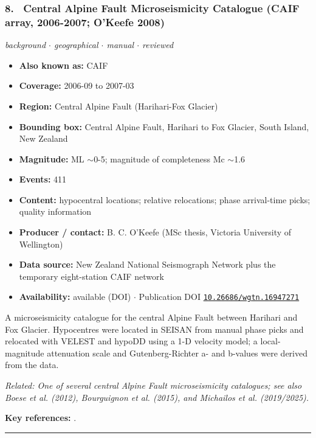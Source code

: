 \documentclass[10pt,a4paper]{article}
\newcommand{\catentryrule}{\par\vspace{3pt}\noindent\textcolor{rulegrey}{\rule{\linewidth}{0.3pt}}\par\vspace{5pt}}
\newcommand{\kv}[2]{\item \textbf{#1:} #2}
\begin{document}
\subsubsection*{\hypertarget{c:8}{8.}~ Central Alpine Fault Microseismicity Catalogue (CAIF array, 2006-2007; O'Keefe 2008)}
{\small\itshape background $\cdot$ geographical $\cdot$ manual $\cdot$ reviewed}\par\vspace{2pt}
\begin{itemize}[leftmargin=1.3em,itemsep=0.6pt,topsep=1pt,parsep=0pt]
\kv{Also known as}{CAIF}
\kv{Coverage}{2006-09 to 2007-03}
\kv{Region}{Central Alpine Fault (Harihari-Fox Glacier)}
\kv{Bounding box}{Central Alpine Fault, Harihari to Fox Glacier, South Island, New Zealand}
\kv{Magnitude}{ML $\sim$0-5; magnitude of completeness Mc $\sim$1.6}
\kv{Events}{411}
\kv{Content}{hypocentral locations; relative relocations; phase arrival-time picks; quality information}
\kv{Producer / contact}{B. C. O'Keefe (MSc thesis, Victoria University of Wellington)}
\kv{Data source}{New Zealand National Seismograph Network plus the temporary eight-station CAIF network}
\kv{Availability}{available (DOI) $\cdot$ Publication DOI \href{https://doi.org/10.26686/wgtn.16947271}{\nolinkurl{10.26686/wgtn.16947271}}}
\end{itemize}
\par\vspace{2pt}A microseismicity catalogue for the central Alpine Fault between Harihari and Fox Glacier. Hypocentres were located in SEISAN from manual phase picks and relocated with VELEST and hypoDD using a 1-D velocity model; a local-magnitude attenuation scale and Gutenberg-Richter a- and b-values were derived from the data.
\par{\small\itshape Related: One of several central Alpine Fault microseismicity catalogues; see also Boese et al. (2012), Bourguignon et al. (2015), and Michailos et al. (2019/2025).}
\par\vspace{2pt}\textbf{Key references:} \cite{OKeefe2008}.
\catentryrule
\end{document}
